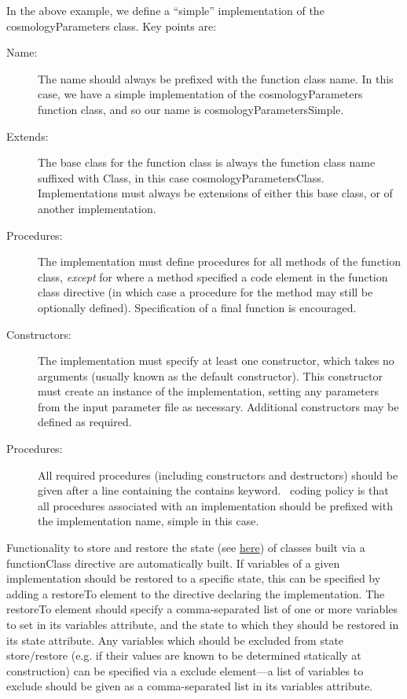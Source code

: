 In the above example, we define a ``simple'' implementation of the {\normalfont cosmologyParameters} class. Key points are:
\begin{description}
\item[Name:] The name should always be prefixed with the function class name. In this case, we have a {\normalfont \ttfamily simple} implementation of the {\normalfont \ttfamily cosmologyParameters} function class, and so our name is {\normalfont \ttfamily cosmologyParametersSimple}.
\item[Extends:] The base class for the function class is always the function class name suffixed with {\normalfont \ttfamily Class}, in this case {\normalfont \ttfamily cosmologyParametersClass}. Implementations must always be extensions of either this base class, or of another implementation.
\item[Procedures:] The implementation must define procedures for all methods of the function class, \emph{except} for where a method specified a {\normalfont \ttfamily code} element in the function class directive (in which case a procedure for the method may still be optionally defined). Specification of a {\normalfont \ttfamily final} function is encouraged.
\item[Constructors:] The implementation must specify at least one constructor, which takes no arguments (usually known as the default constructor). This constructor must create an instance of the implementation, setting any parameters from the input parameter file as necessary. Additional constructors may be defined as required.
\item[Procedures:] All required procedures (including constructors and destructors) should be given after a line containing the {\normalfont \ttfamily contains} keyword. \glc\ coding policy is that all procedures associated with an implementation should be prefixed with the implementation name, {\normalfont \ttfamily simple} in this case.
\end{description}

Functionality to store and restore the state (see \href{https://github.com/galacticusorg/galacticus/releases/download/bleeding-edge/Galacticus_Usage.pdf\#sec.Restarting}{here}) of classes built via a {\normalfont \ttfamily functionClass} directive are automatically built. If variables of a given implementation should be restored to a specific state, this can be specified by adding a {\normalfont \ttfamily restoreTo} element to the directive declaring the implementation. The {\normalfont \ttfamily restoreTo} element should specify a comma-separated list of one or more variables to set in its {\normalfont \ttfamily variables} attribute, and the state to which they should be restored in its {\normalfont \ttfamily state} attribute. Any variables which should be excluded from state store/restore (e.g. if their values are known to be determined statically at construction) can be specified via a {\normalfont \ttfamily exclude} element---a list of variables to exclude should be given as a comma-separated list in its {\normalfont \ttfamily variables} attribute.

